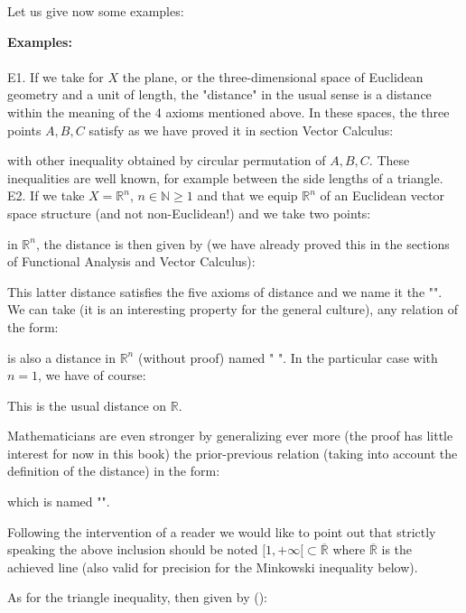 	\pagebreak
	Let us give now some examples:
	\begin{tcolorbox}[colframe=black,colback=white,sharp corners]
	\textbf{{\Large {}}Examples:}\\\\
	E1. If we take for $X$ the plane, or the three-dimensional space of Euclidean geometry and a unit of length, the "distance" in the usual sense is a distance within the meaning of the 4 axioms mentioned above. In these spaces, the three points $A, B, C$ satisfy as we have proved it in section Vector Calculus:
	
	with other inequality obtained by circular permutation of $A, B, C$. These inequalities are well known, for example between the side lengths of a triangle.\\
	
	E2. If we take $X=\mathbb{R}^n$, $n \in \mathbb{N} \geq 1$ and that we equip $\mathbb{R}^n$ of an Euclidean vector space structure (and not non-Euclidean!) and we take two points:
	
	in $\mathbb{R}^n$, the distance is then given by (we have already proved this in the sections of Functional Analysis and Vector Calculus):
	
	\end{tcolorbox}
	\label{euclidean topology}This latter distance satisfies the five axioms of distance and we name it the "". We can take (it is an interesting property for the general culture), any relation of the form:
	
	is also a distance in $\mathbb{R}^n$ (without proof) named " ". In the particular case with $n=1$, we have of course:
	
	This is the usual distance on $\mathbb{R}$.
	
	Mathematicians are even stronger by generalizing ever more (the proof has little interest for now in this book) the prior-previous relation (taking into account the definition of the distance) in the form:
	
	which is named "".
	\begin{tcolorbox}[title=Remark,colframe=black,arc=10pt]
	Following the intervention of a reader we would like to point out that strictly speaking the above inclusion should be noted $[1,+\infty[ \subset \mathbb{\overline{R}}$ where $\mathbb{\overline{R}}$ is the achieved line (also valid for precision for the Minkowski inequality below).
	\end{tcolorbox}	
	As for the triangle inequality, then given by ():
	
